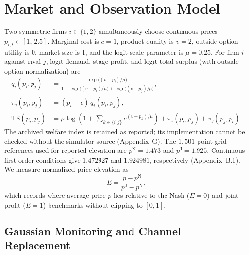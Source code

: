 \documentclass{article}
\begin{document}
\section{Market and Observation Model}

Two symmetric firms $i\in\{1,2\}$ simultaneously choose continuous prices $p_{i,t}\in[1,\,2.5]$. Marginal cost is $c=1$, product quality is $v=2$, outside option utility is $0$, market size is $1$, and the logit scale parameter is $\mu=0.25$. For firm $i$ against rival $j$, logit demand, stage profit, and logit total surplus (with outside-option normalization) are
\begin{align}
q_i(p_i,p_j) &= \frac{\exp\!\bigl((v-p_i)/\mu\bigr)}
{1+\exp\!\bigl((v-p_i)/\mu\bigr)+\exp\!\bigl((v-p_j)/\mu\bigr)},\\[3pt]
\pi_i(p_i,p_j) &= (p_i - c)\,q_i(p_i,p_j),\\[3pt]
\mathrm{TS}(p_i,p_j) &= \mu\log\!\left(1+\sum_{k\in\{i,j\}}e^{(v-p_k)/\mu}\right)+\pi_i(p_i,p_j)+\pi_j(p_j,p_i).
\end{align}
The archived welfare index is retained as reported; its implementation cannot be checked without the simulator source (Appendix~G). The $1{,}501$-point grid references used for reported elevation are $p^{\mathrm{N}}=1.473$ and $p^{\mathrm{J}}=1.925$. Continuous first-order conditions give $1.472927$ and $1.924981$, respectively (Appendix~B.1). We measure normalized price elevation as
\[
E = \frac{\bar{p}-p^{\mathrm{N}}}{p^{\mathrm{J}}-p^{\mathrm{N}}},
\]
which records where average price $\bar{p}$ lies relative to the Nash ($E=0$) and joint-profit ($E=1$) benchmarks without clipping to $[0,1]$.

\subsection{Gaussian Monitoring and Channel Replacement}
\end{document}
